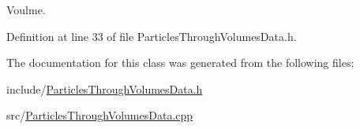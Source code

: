 Voulme. 



Definition at line 33 of file Particles\-Through\-Volumes\-Data.\-h.



The documentation for this class was generated from the following files\-:\begin{DoxyCompactItemize}
\item 
include/\hyperlink{_particles_through_volumes_data_8h}{Particles\-Through\-Volumes\-Data.\-h}\item 
src/\hyperlink{_particles_through_volumes_data_8cpp}{Particles\-Through\-Volumes\-Data.\-cpp}\end{DoxyCompactItemize}
